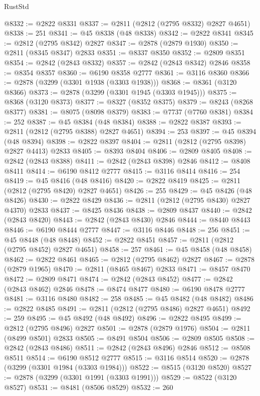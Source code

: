 \begin{lexlean}{RustStd}
\begin{coremodule}
{\begin{coremodule}
{{{{{{{{{{{{{{{{{{{{{{{{{{{{{{{{{@8332 := @2822 @8331
@8337 := @2811 (@2812 (@2795 @8332) @2827 @4651)
@8338 := 251
@8341 := @45 @8338 (@48 @8338)
@8342 := @2822 @8341
@8345 := @2812 (@2795 @8342) @2827
@8347 := @2878 (@2879 @1930)
@8350 := @2811 (@8345 @8347) @2833
@8351 := @8337 @8350
@8352 := @2809 @8351
@8354 := @2842 (@2843 @8332)
@8357 := @2842 (@2843 @8342) @2846
@8358 := @8354 @8357
@8360 := @6190 @8358 @2777
@8361 := @3116 @8360
@8366 := @2878 (@3299 (@3301 @1938 (@3303 @1938)))
@8368 := @8361 (@3120 @8366)
@8373 := @2878 (@3299 (@3301 @1945 (@3303 @1945)))
@8375 := @8368 (@3120 @8373)
@8377 := @8327 (@8352 @8375)
@8379 := @8243 (@8268 @8377)
@8381 := @8075 (@8098 @8379)
@8383 := @7737 (@7760 @8381)
@8384 := 252
@8387 := @45 @8384 (@48 @8384)
@8388 := @2822 @8387
@8393 := @2811 (@2812 (@2795 @8388) @2827 @4651)
@8394 := 253
@8397 := @45 @8394 (@48 @8394)
@8398 := @2822 @8397
@8404 := @2811 (@2812 (@2795 @8398) @2827 @4413) @2833
@8405 := @8393 @8404
@8406 := @2809 @8405
@8408 := @2842 (@2843 @8388)
@8411 := @2842 (@2843 @8398) @2846
@8412 := @8408 @8411
@8414 := @6190 @8412 @2777
@8415 := @3116 @8414
@8416 := 254
@8419 := @45 @8416 (@48 @8416)
@8420 := @2822 @8419
@8425 := @2811 (@2812 (@2795 @8420) @2827 @4651)
@8426 := 255
@8429 := @45 @8426 (@48 @8426)
@8430 := @2822 @8429
@8436 := @2811 (@2812 (@2795 @8430) @2827 @4370) @2833
@8437 := @8425 @8436
@8438 := @2809 @8437
@8440 := @2842 (@2843 @8420)
@8443 := @2842 (@2843 @8430) @2846
@8444 := @8440 @8443
@8446 := @6190 @8444 @2777
@8447 := @3116 @8446
@8448 := 256
@8451 := @45 @8448 (@48 @8448)
@8452 := @2822 @8451
@8457 := @2811 (@2812 (@2795 @8452) @2827 @4651)
@8458 := 257
@8461 := @45 @8458 (@48 @8458)
@8462 := @2822 @8461
@8465 := @2812 (@2795 @8462) @2827
@8467 := @2878 (@2879 @1965)
@8470 := @2811 (@8465 @8467) @2833
@8471 := @8457 @8470
@8472 := @2809 @8471
@8474 := @2842 (@2843 @8452)
@8477 := @2842 (@2843 @8462) @2846
@8478 := @8474 @8477
@8480 := @6190 @8478 @2777
@8481 := @3116 @8480
@8482 := 258
@8485 := @45 @8482 (@48 @8482)
@8486 := @2822 @8485
@8491 := @2811 (@2812 (@2795 @8486) @2827 @4651)
@8492 := 259
@8495 := @45 @8492 (@48 @8492)
@8496 := @2822 @8495
@8499 := @2812 (@2795 @8496) @2827
@8501 := @2878 (@2879 @1976)
@8504 := @2811 (@8499 @8501) @2833
@8505 := @8491 @8504
@8506 := @2809 @8505
@8508 := @2842 (@2843 @8486)
@8511 := @2842 (@2843 @8496) @2846
@8512 := @8508 @8511
@8514 := @6190 @8512 @2777
@8515 := @3116 @8514
@8520 := @2878 (@3299 (@3301 @1984 (@3303 @1984)))
@8522 := @8515 (@3120 @8520)
@8527 := @2878 (@3299 (@3301 @1991 (@3303 @1991)))
@8529 := @8522 (@3120 @8527)
@8531 := @8481 (@8506 @8529)
@8532 := 260
}}}}}}}}}}}}}}}}}}}}}}}}}}}}}}}}}
\end{coremodule}}
\end{coremodule}
\end{lexlean}
